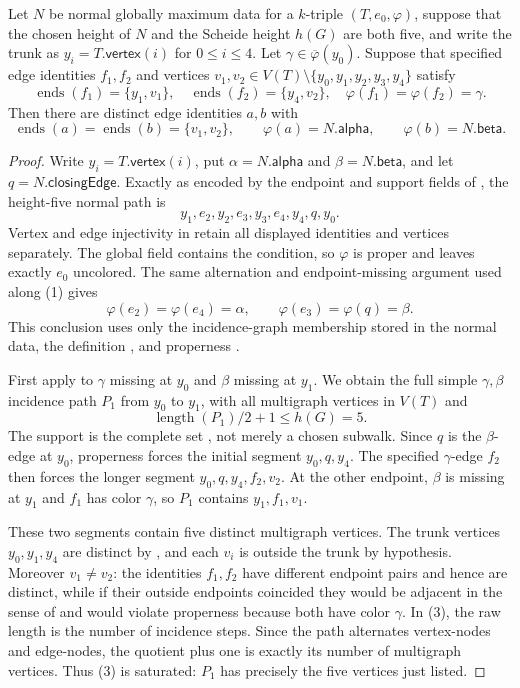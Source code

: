 \begin{lemma}
Let $N$ be normal globally maximum data for a $k$-triple
$(T,e_0,\varphi)$, suppose that the chosen height of $N$ and the Scheide
height $h(G)$ are both five, and write the trunk as
$y_i=T.\mathsf{vertex}(i)$ for $0\leq i\leq4$.  Let
$\gamma\in\overline\varphi(y_0)$.  Suppose that specified edge identities
$f_1,f_2$ and vertices
$v_1,v_2\in V(T)\setminus\{y_0,y_1,y_2,y_3,y_4\}$ satisfy
\[
 \operatorname{ends}(f_1)=\{y_1,v_1\},\quad
 \operatorname{ends}(f_2)=\{y_4,v_2\},\quad
 \varphi(f_1)=\varphi(f_2)=\gamma.
\]
Then there are distinct edge identities $a,b$ with
\[
 \operatorname{ends}(a)=\operatorname{ends}(b)=\{v_1,v_2\},
 \qquad \varphi(a)=N.\mathsf{alpha},
 \qquad \varphi(b)=N.\mathsf{beta}.
\]
\end{lemma}
\begin{proof}
Write $y_i=T.\mathsf{vertex}(i)$, put
$\alpha=N.\mathsf{alpha}$ and $\beta=N.\mathsf{beta}$, and let
$q=N.\mathsf{closingEdge}$.  Exactly as encoded by the endpoint and
support fields of , the height-five
normal path is
\[
 y_1,e_2,y_2,e_3,y_3,e_4,y_4,q,y_0.                 \tag{1}
\]
Vertex and edge injectivity in  retain all displayed
identities and vertices separately.  The global field
 contains the  condition,
so $\varphi$ is proper and leaves exactly $e_0$ uncolored.  The same
alternation and endpoint-missing argument used along (1) gives
\[
 \varphi(e_2)=\varphi(e_4)=\alpha,
 \qquad \varphi(e_3)=\varphi(q)=\beta.              \tag{2}
\]
This conclusion uses only the incidence-graph membership stored in the
normal data, the definition , and
properness .

First apply  to $\gamma$ missing at
$y_0$ and $\beta$ missing at $y_1$.  We obtain the full simple
$\gamma,\beta$ incidence path $P_1$ from $y_0$ to $y_1$, with all
multigraph vertices in $V(T)$ and
\[
 \operatorname{length}(P_1)/2+1\leq h(G)=5.          \tag{3}
\]
The support is the complete set , not merely a
chosen subwalk.  Since $q$ is the $\beta$-edge at $y_0$, properness forces
the initial segment $y_0,q,y_4$.  The specified $\gamma$-edge $f_2$ then
forces the longer segment
$y_0,q,y_4,f_2,v_2$.  At the other endpoint, $\beta$ is missing at $y_1$
and $f_1$ has color $\gamma$, so $P_1$ contains
$y_1,f_1,v_1$.

These two segments contain five distinct multigraph vertices.  The trunk
vertices $y_0,y_1,y_4$ are distinct by , and each
$v_i$ is outside the trunk by hypothesis.  Moreover $v_1\ne v_2$: the
identities $f_1,f_2$ have different endpoint pairs and hence are distinct,
while if their outside endpoints coincided they would be adjacent in the
sense of  and would violate properness because both
have color $\gamma$.  In (3), the raw length is the number of incidence
steps.  Since the path alternates vertex-nodes and edge-nodes, the quotient
plus one is exactly its number of multigraph vertices.  Thus (3) is
saturated: $P_1$ has precisely the five vertices just listed.


\end{proof}
